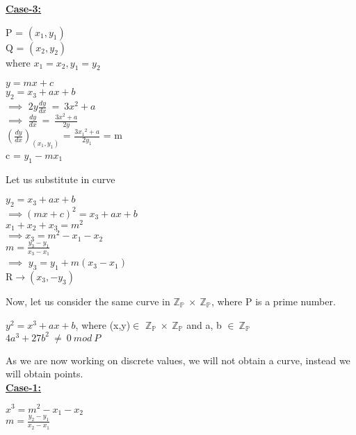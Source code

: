 \documentclass[11pt]{article}
\begin{document}
\textbf{\underline{Case-3:}}
\begin{center}
    P = $(x_1,y_1)$\\
    Q = $(x_2,y_2)$\\
    where $x_1=x_2, y_1=y_2$\\
\end{center}

\begin{center}
    $y = mx+c$\\
    \vspace{1mm}
    $y_2=x_3+ax+b$\\
    \vspace{1mm}
    $\implies$ $2y\frac{dy}{dx}\ =\ 3x^2+a$\\
    \vspace{1mm}
    $\implies$ $\frac{dy}{dx}\ =\ \frac{3x^2+a}{2y}$\\
    \vspace{1mm}
    ${(\frac{dy}{dx})}_{(x_1,y_1)}$ = $\frac{3{x_1}^2+a}{2y_1}$ = m\\
    \vspace{3mm}
    c = $y_1-mx_1$\\
\end{center}
Let us substitute in curve
\begin{center}
    $y_2=x_3+ax+b$\\
    $\implies$${(mx+c)}^2 = x_3+ax+b$\\
    $x_1+x_2+x_3=m^2$\\
    $\implies$$x_3=m^2-x_1-x_2$\\
    $m = \frac{y_3-y_1}{x_3-x_1}$\\
    $\implies$ $y_3 = y_1+m(x_3-x_1)$\\
    R$\rightarrow(x_3,-y_3)$\\
\end{center}
Now, let us consider the same curve in $\mathbb{Z_P}\ \times\ \mathbb{Z_P}$, where P is a prime number.
\begin{center}
    $y^2=x^3+ax+b$, where (x,y)$\in$ $\mathbb{Z_P}\ \times\ \mathbb{Z_P}$ and a, b $\in\ \mathbb{Z_P}$\\
    \vspace{1mm}
    $4a^3+27b^2\ \neq\ 0\ mod\ P$\\
\end{center}
As we are now working on discrete values, we will not obtain a curve, instead we will obtain points.\\
\textbf{\underline{Case-1:}}\\
\begin{center}
    $x^3=m^2-x_1-x_2$\\
    \vspace{1mm}
    $m = \frac{y_2-y_1}{x_2-x_1}$\\
\end{center}
\end{document}
